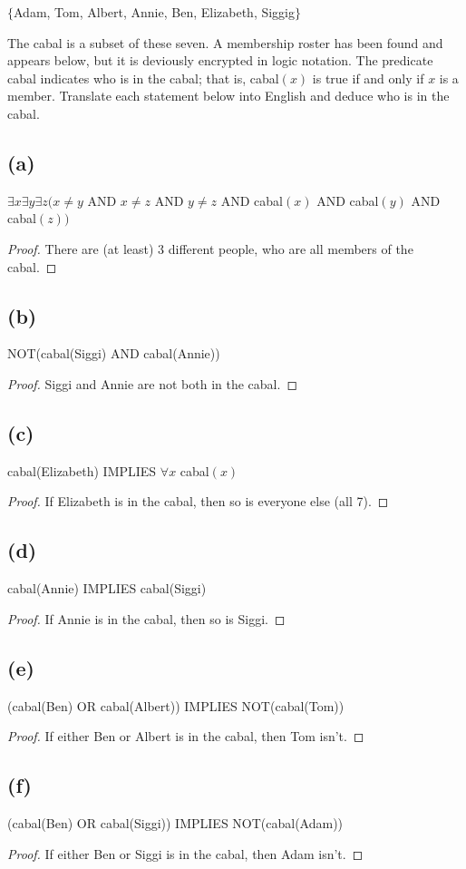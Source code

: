 \documentclass[14pt]{extarticle}
\begin{document}
\begin{center}
$\{$Adam, Tom, Albert, Annie, Ben, Elizabeth, Siggig$\}$
\end{center}

The cabal is a subset of these seven. A membership roster has been found and appears below, but it is deviously encrypted in logic notation. The predicate cabal indicates who is in the cabal; that is, cabal$(x)$ is true if and only if $x$ is a member. Translate each statement below into English and deduce who is in the cabal.

\subsection{(a)}
$\exists x \exists y \exists z(x \neq y$ AND $x \neq z$ AND $y \neq z$ AND cabal$(x)$ AND cabal$(y)$ AND cabal$(z))$
\begin{proof}
There are (at least) 3 different people, who are all members of the cabal.
\end{proof}
\subsection{(b)}
NOT(cabal(Siggi) AND cabal(Annie))
\begin{proof}
Siggi and Annie are not both in the cabal. 
\end{proof}
\subsection{(c)}
cabal(Elizabeth) IMPLIES $\forall x$ cabal$(x)$
\begin{proof}
If Elizabeth is in the cabal, then so is everyone else (all 7).
\end{proof}
\subsection{(d)}
cabal(Annie) IMPLIES cabal(Siggi)
\begin{proof}
If Annie is in the cabal, then so is Siggi.
\end{proof}
\subsection{(e)}
(cabal(Ben) OR cabal(Albert)) IMPLIES NOT(cabal(Tom))
\begin{proof}
If either Ben or Albert is in the cabal, then Tom isn't.
\end{proof}
\subsection{(f)}
(cabal(Ben) OR cabal(Siggi)) IMPLIES NOT(cabal(Adam))
\begin{proof}
If either Ben or Siggi is in the cabal, then Adam isn't.
\end{proof}
\end{document}
